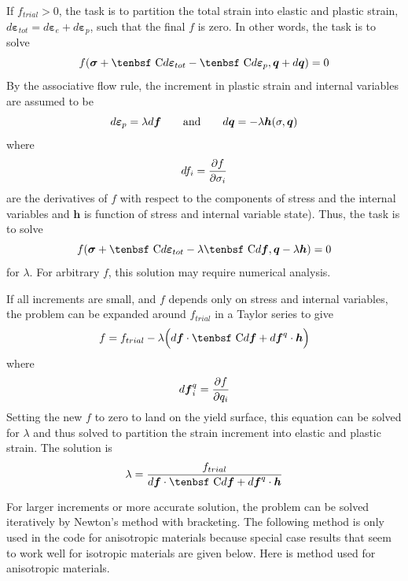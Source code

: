 \documentclass[11pt]{book}
\renewcommand{\vec}[1]{\boldsymbol{#1}}
\def\C{\hbox{\tenbsf C}}
\def\del{d \vec{\varepsilon}_{e}}
\def\dpl{d \vec{\varepsilon}_{p}}
\def\deff{d \vec{\varepsilon}_{tot}}
\def\df{d \vec{f}}
\def\dfq{d \vec{f}^q}
\def\dq{d\vec q}
\begin{document}
If $f_{trial}>0$, the task is to partition the total strain into elastic and plastic strain, $\deff=\del+\dpl$, such that the final $f$ is zero. In other words, the task is to solve
\begin{equation}
     f(\vec\sigma + \C \deff  - \C\dpl,\vec q + \dq) = 0
\end{equation}
By the associative flow rule, the increment in plastic strain and internal variables are assumed to be 
\begin{equation}
      \dpl = \lambda\df   \qquad {\rm and}\qquad \dq = -\lambda \vec h(\sigma,\vec q)
\end{equation}
where
\begin{equation}
      df_i = {\partial f\over \partial\sigma_i}   
\end{equation}
are the derivatives of $f$ with respect to the components of stress and the internal variables and $\vec h$ is function of stress and internal variable state). Thus, the task is to solve
\begin{equation}
     f(\vec\sigma + \C \deff - \lambda\C\df,\vec q -\lambda \vec h) = 0
\end{equation}
for $\lambda$. For arbitrary $f$, this solution may require numerical analysis.

If all increments are small, and $f$ depends only on stress and internal variables, the problem can be expanded around $f_{trial}$ in a Taylor series to give
\begin{equation}
    f  = f_{trial} - \lambda\Bigl( \df \cdot \C \df + \dfq \cdot \vec h \Bigr)
\end{equation}
where
\begin{equation}
\dfq_i = {\partial f\over \partial q_i}
\end{equation}
Setting the new $f$ to zero to land on the yield surface, this equation can be solved for $\lambda$ and thus solved to partition the strain increment into elastic and plastic strain. The solution is
\begin{equation}
        \lambda = { f_{trial}   \over  \df\cdot \C\df + \dfq \cdot \vec h }     \label{lambdaInitial}
\end{equation}

For larger increments or more accurate solution, the problem can be solved iteratively by Newton's method with bracketing. The following method is only used in the code for anisotropic materials because special case results that seem to work well for isotropic materials are given below. Here is method used for anisotropic materials.
\end{document}
